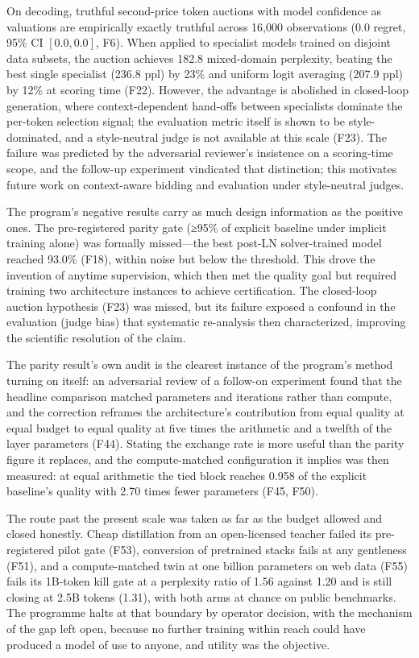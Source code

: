 On decoding, truthful second-price token auctions with model confidence as valuations are empirically exactly truthful across 16,000 observations ($0.0$ regret, 95\% CI $[0.0, 0.0]$, F6). When applied to specialist models trained on disjoint data subsets, the auction achieves 182.8 mixed-domain perplexity, beating the best single specialist (236.8 ppl) by 23\% and uniform logit averaging (207.9 ppl) by 12\% at scoring time (F22). However, the advantage is abolished in closed-loop generation, where context-dependent hand-offs between specialists dominate the per-token selection signal; the evaluation metric itself is shown to be style-dominated, and a style-neutral judge is not available at this scale (F23). The failure was predicted by the adversarial reviewer's insistence on a scoring-time scope, and the follow-up experiment vindicated that distinction; this motivates future work on context-aware bidding and evaluation under style-neutral judges.

The program's negative results carry as much design information as the positive ones. The pre-registered parity gate (≥95\% of explicit baseline under implicit training alone) was formally missed---the best post-LN solver-trained model reached 93.0\% (F18), within noise but below the threshold. This drove the invention of anytime supervision, which then met the quality goal but required training two architecture instances to achieve certification. The closed-loop auction hypothesis (F23) was missed, but its failure exposed a confound in the evaluation (judge bias) that systematic re-analysis then characterized, improving the scientific resolution of the claim.

The parity result's own audit is the clearest instance of the program's method turning on itself: an adversarial review of a follow-on experiment found that the headline comparison matched parameters and iterations rather than compute, and the correction reframes the architecture's contribution from equal quality at equal budget to equal quality at five times the arithmetic and a twelfth of the layer parameters (F44). Stating the exchange rate is more useful than the parity figure it replaces, and the compute-matched configuration it implies was then measured: at equal arithmetic the tied block reaches 0.958 of the explicit baseline's quality with 2.70 times fewer parameters (F45, F50).

The route past the present scale was taken as far as the budget allowed and closed honestly. Cheap distillation from an open-licensed teacher failed its pre-registered pilot gate (F53), conversion of pretrained stacks fails at any gentleness (F51), and a compute-matched twin at one billion parameters on web data (F55) fails its 1B-token kill gate at a perplexity ratio of 1.56 against 1.20 and is still closing at 2.5B tokens (1.31), with both arms at chance on public benchmarks. The programme halts at that boundary by operator decision, with the mechanism of the gap left open, because no further training within reach could have produced a model of use to anyone, and utility was the objective.

